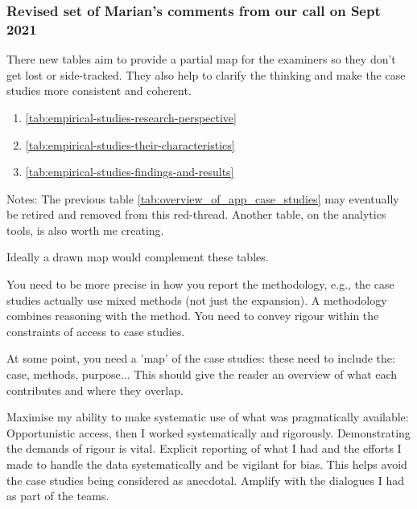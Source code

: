 \subsubsection{Revised set of Marian's comments from our call on  Sept 2021}


There new tables aim to provide a partial map for the examiners so they don't get lost or side-tracked. They also help to clarify the thinking and make the case studies more consistent and coherent.

\begin{enumerate}
    \item \ref{tab:empirical-studies-research-perspective} 
    \item \ref{tab:empirical-studies-their-characteristics} 
    \item \ref{tab:empirical-studies-findings-and-results} 
\end{enumerate}

Notes: The previous table \ref{tab:overview_of_app_case_studies}  may eventually be retired and removed from this red-thread. Another table, on the analytics tools, is also worth me creating.

Ideally a drawn map would complement these tables.


You need to be more precise in how you report the methodology, e.g., the case studies actually use mixed methods (not just the expansion). A methodology combines reasoning with the method. You need to convey rigour within the constraints of access to case studies.

At some point, you need a 'map' of the case studies:  these need to include the: case, methods, purpose...  This should give the reader an overview of what each contributes and where they overlap.



Maximise my ability to make systematic use of what was pragmatically available: Opportunistic access, then I worked systematically and rigorously. Demonstrating the demands of rigour is vital. Explicit reporting of what I had and the efforts I made to handle the data systematically and be vigilant for bias. This helps avoid the case studies being considered as anecdotal. Amplify with the dialogues I had as part of the teams.

